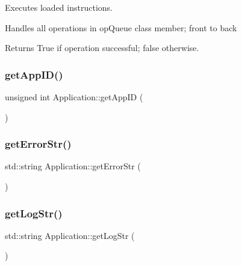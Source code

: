 Executes loaded instructions. 

Handles all operations in op\+Queue class member; front to back

\begin{DoxyReturn}{Returns}
True if operation successful; false otherwise. 
\end{DoxyReturn}
\hypertarget{class_application_a3865334b425d0129d6e8bff18af4538c}{}\label{class_application_a3865334b425d0129d6e8bff18af4538c} 
\subsubsection{\texorpdfstring{get\+App\+I\+D()}{getAppID()}}
{\footnotesize\ttfamily unsigned int Application\+::get\+App\+ID (\begin{DoxyParamCaption}{ }\end{DoxyParamCaption})\hspace{0.3cm}{\ttfamily [inline]}}

\hypertarget{class_application_a355bf7238b12a83427a08908b9fcd922}{}\label{class_application_a355bf7238b12a83427a08908b9fcd922} 
\subsubsection{\texorpdfstring{get\+Error\+Str()}{getErrorStr()}}
{\footnotesize\ttfamily std\+::string Application\+::get\+Error\+Str (\begin{DoxyParamCaption}{ }\end{DoxyParamCaption})\hspace{0.3cm}{\ttfamily [inline]}}

\hypertarget{class_application_a66dc20ae5dc8c57d09cc4696ded5469a}{}\label{class_application_a66dc20ae5dc8c57d09cc4696ded5469a} 
\subsubsection{\texorpdfstring{get\+Log\+Str()}{getLogStr()}}
{\footnotesize\ttfamily std\+::string Application\+::get\+Log\+Str (\begin{DoxyParamCaption}{ }\end{DoxyParamCaption})\hspace{0.3cm}{\ttfamily [inline]}}

